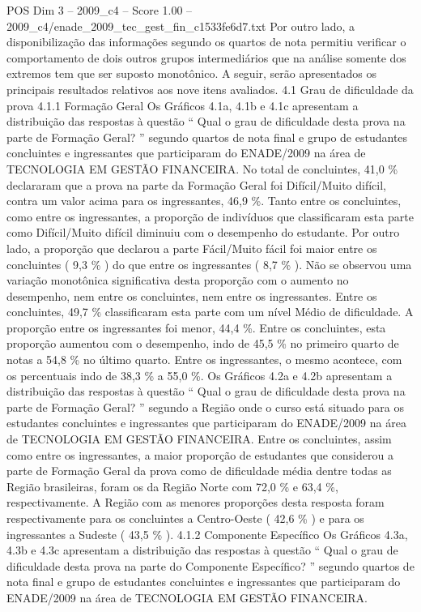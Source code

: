\begin{textsample}{POS Dim 3 – 2009\_c4 – Score 1.00 – 2009\_c4/enade\_2009\_tec\_gest\_fin\_c1533fe6d7.txt}
Por outro lado, a disponibilização das informações segundo os quartos de nota permitiu verificar o comportamento de dois outros grupos intermediários que na análise somente dos extremos tem que ser suposto monotônico.
A seguir, serão apresentados os principais resultados relativos aos nove itens avaliados. 4.1 Grau de dificuldade da prova 4.1.1 Formação Geral Os Gráficos 4.1a, 4.1b e 4.1c apresentam a distribuição das respostas à questão “ Qual o grau de dificuldade desta prova na parte de Formação Geral? ” segundo quartos de nota final e grupo de estudantes concluintes e ingressantes que participaram do ENADE/2009 na área de TECNOLOGIA EM GESTÃO FINANCEIRA.
No total de concluintes, 41,0 \% declararam que a prova na parte da Formação Geral foi Difícil/Muito difícil, contra um valor acima para os ingressantes, 46,9 \%.
Tanto entre os concluintes, como entre os ingressantes, a proporção de indivíduos que classificaram esta parte como Difícil/Muito difícil diminuiu com o desempenho do estudante.
Por outro lado, a proporção que declarou a parte Fácil/Muito fácil foi maior entre os concluintes ( 9,3 \% ) do que entre os ingressantes ( 8,7 \% ).
Não se observou uma variação monotônica significativa desta proporção com o aumento no desempenho, nem entre os concluintes, nem entre os ingressantes.
Entre os concluintes, 49,7 \% classificaram esta parte com um nível Médio de dificuldade.
A proporção entre os ingressantes foi menor, 44,4 \%.
Entre os concluintes, esta proporção aumentou com o desempenho, indo de 45,5 \% no primeiro quarto de notas a 54,8 \% no último quarto.
Entre os ingressantes, o mesmo acontece, com os percentuais indo de 38,3 \% a 55,0 \%.
Os Gráficos 4.2a e 4.2b apresentam a distribuição das respostas à questão “ Qual o grau de dificuldade desta prova na parte de Formação Geral? ” segundo a Região onde o curso está situado para os estudantes concluintes e ingressantes que participaram do ENADE/2009 na área de TECNOLOGIA EM GESTÃO FINANCEIRA.
Entre os concluintes, assim como entre os ingressantes, a maior proporção de estudantes que considerou a parte de Formação Geral da prova como de dificuldade média dentre todas as Região brasileiras, foram os da Região Norte com 72,0 \% e 63,4 \%, respectivamente.
A Região com as menores proporções desta resposta foram respectivamente para os concluintes a Centro-Oeste ( 42,6 \% ) e para os ingressantes a Sudeste ( 43,5 \% ). 4.1.2 Componente Específico Os Gráficos 4.3a, 4.3b e 4.3c apresentam a distribuição das respostas à questão “ Qual o grau de dificuldade desta prova na parte do Componente Específico? ” segundo quartos de nota final e grupo de estudantes concluintes e ingressantes que participaram do ENADE/2009 na área de TECNOLOGIA EM GESTÃO FINANCEIRA.

\end{textsample}
